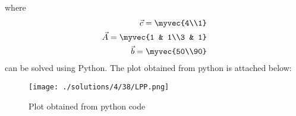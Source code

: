 where
\begin{align}
    \Vec{c}=\myvec{4\\1}\\
    \Vec{A}=\myvec{1 & 1\\3 & 1}\\
    \Vec{b}=\myvec{50\\90}
\end{align}
can be solved using Python. The plot obtained from python is attached below:
\begin{figure}[!ht]
\centering
\texttt{[image: ./solutions/4/38/LPP.png]}
\caption{Plot obtained from python code}
\label{eq:solutions/4/38/Fig:1}
\end{figure}
